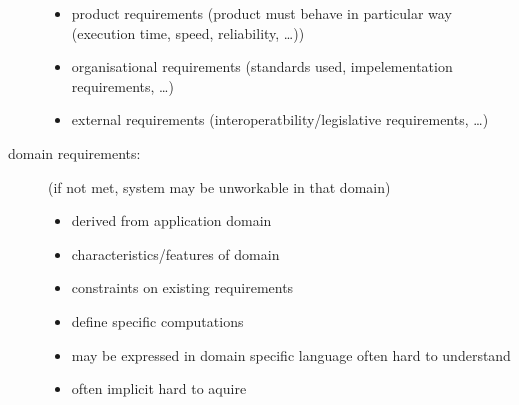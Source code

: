 \documentclass[a4paper, 10pt]{article}
\begin{document}
\begin{description}
\begin{itemize}
			\item product requirements (product must behave in particular way (execution time, speed, reliability, \dots))
			\item organisational requirements (standards used, impelementation requirements, \dots)
			\item external requirements (interoperatbility/legislative requirements, \dots)
		\end{itemize}
		\item[domain requirements:] (if not met, system may be unworkable in that domain)
			\begin{itemize}
				\item derived from application domain
				\item characteristics/features of domain
				\item constraints on existing requirements
				\item define specific computations
				\item may be expressed in domain specific language \follows often hard to understand
				\item often implicit \follows hard to aquire
			\end{itemize}
\end{description}
\end{document}
